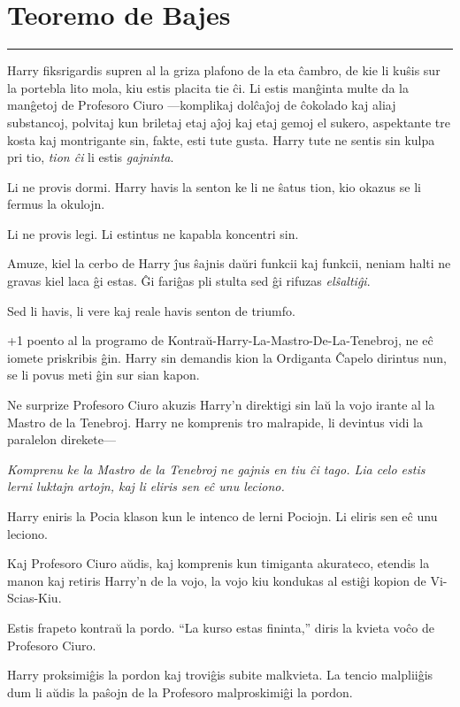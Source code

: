\chapter{Teoremo de Bajes}

\begin{center}\rule{3in}{0.4pt}\end{center}

Harry fiksrigardis supren al la griza plafono de la eta ĉambro, de kie
li kuŝis sur la portebla lito mola, kiu estis placita tie ĉi. Li estis
manĝinta multe da la manĝetoj de Profesoro Ciuro —komplikaj dolĉaĵoj
de ĉokolado kaj aliaj substancoj, polvitaj kun briletaj etaj aĵoj kaj
etaj gemoj el sukero, aspektante tre kosta kaj montrigante sin, fakte,
esti tute gusta. Harry tute ne sentis sin kulpa pri tio, \emph{tion
ĉi} li estis \emph{gajninta}.

Li ne provis dormi. Harry havis la senton ke li ne ŝatus tion, kio
okazus se li fermus la okulojn.

Li ne provis legi. Li estintus ne kapabla koncentri sin.

Amuze, kiel la cerbo de Harry ĵus ŝajnis daŭri funkcii kaj funkcii,
neniam halti ne gravas kiel laca ĝi estas. Ĝi fariĝas pli stulta sed
ĝi rifuzas \emph{elŝaltiĝi}.

Sed li havis, li vere kaj reale havis senton de triumfo.

+1 poento al la programo de Kontraŭ-Harry-La-Mastro-De-La-Tenebroj,
ne eĉ iomete priskribis ĝin. Harry sin demandis kion la Ordiganta
Ĉapelo dirintus nun, se li povus meti ĝin sur sian kapon.

Ne surprize Profesoro Ciuro akuzis Harry'n direktigi sin laŭ la vojo
irante al la Mastro de la Tenebroj. Harry ne komprenis tro malrapide,
li devintus vidi la paralelon direkete—

\emph{Komprenu ke la Mastro de la Tenebroj ne gajnis en tiu ĉi tago. Lia
  celo estis lerni luktajn artojn, kaj li eliris sen eĉ unu leciono.}

Harry eniris la Pocia klason kun le intenco de lerni Pociojn. Li
eliris sen eĉ unu leciono.

Kaj Profesoro Ciuro aŭdis, kaj komprenis kun timiganta akurateco,
etendis la manon kaj retiris Harry'n de la vojo, la vojo kiu kondukas
al estiĝi kopion de Vi-Scias-Kiu.

Estis frapeto kontraŭ la pordo. ``La kurso estas fininta,'' diris la
kvieta voĉo de Profesoro Ciuro.

Harry proksimiĝis la pordon kaj troviĝis subite malkvieta. La tencio
malpliiĝis dum li aŭdis la paŝojn de la Profesoro malproskimiĝi la
pordon.

